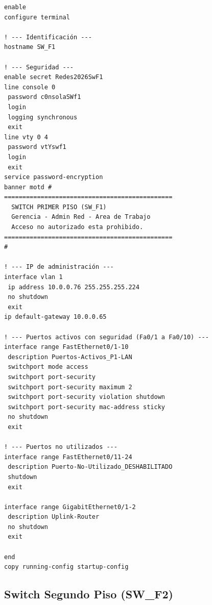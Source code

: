 \documentclass[letterpaper,11pt]{article}
\begin{document}
\begin{lstlisting}[style=cisco, caption={Configuración completa de SW\_F1}]
enable
configure terminal

! --- Identificación ---
hostname SW_F1

! --- Seguridad ---
enable secret Redes2026SwF1
line console 0
 password c0nsolaSWf1
 login
 logging synchronous
 exit
line vty 0 4
 password vtYswf1
 login
 exit
service password-encryption
banner motd #
==============================================
  SWITCH PRIMER PISO (SW_F1)
  Gerencia - Admin Red - Area de Trabajo
  Acceso no autorizado esta prohibido.
==============================================
#

! --- IP de administración ---
interface vlan 1
 ip address 10.0.0.76 255.255.255.224
 no shutdown
 exit
ip default-gateway 10.0.0.65

! --- Puertos activos con seguridad (Fa0/1 a Fa0/10) ---
interface range FastEthernet0/1-10
 description Puertos-Activos_P1-LAN
 switchport mode access
 switchport port-security
 switchport port-security maximum 2
 switchport port-security violation shutdown
 switchport port-security mac-address sticky
 no shutdown
 exit

! --- Puertos no utilizados ---
interface range FastEthernet0/11-24
 description Puerto-No-Utilizado_DESHABILITADO
 shutdown
 exit

interface range GigabitEthernet0/1-2
 description Uplink-Router
 no shutdown
 exit

end
copy running-config startup-config
\end{lstlisting}

\subsection{Switch Segundo Piso (SW\_F2)}
\end{document}

